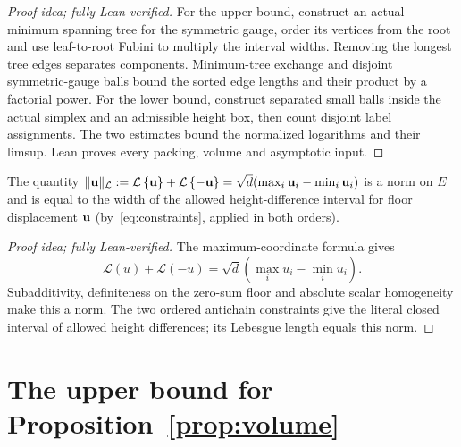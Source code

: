 \documentclass[11pt,letterpaper]{article}
\begin{document}
\begin{proof}[Proof idea; fully Lean-verified]
For the upper bound, construct an actual minimum spanning tree for the symmetric gauge, order its vertices from the root and use leaf-to-root Fubini to multiply the interval widths. Removing the longest tree edges separates components. Minimum-tree exchange and disjoint symmetric-gauge balls bound the sorted edge lengths and their product by a factorial power. For the lower bound, construct separated small balls inside the actual simplex and an admissible height box, then count disjoint label assignments. The two estimates bound the normalized logarithms and their limsup. Lean proves every packing, volume and asymptotic input.
\end{proof}


The quantity $\|\mathbf u\|_{\mathcal L}:=\mathcal L\left\{\mathbf u\right\}+\mathcal L\left\{-\mathbf u\right\}=\sqrt d(\max_i\mathbf u_i-\min_i\mathbf u_i)$ is a norm on $E$ and is equal to the width of the allowed height-difference interval for floor displacement $\mathbf u$ (by~\eqref{eq:constraints}, applied in both orders).

\begin{proof}[Proof idea; fully Lean-verified]
The maximum-coordinate formula gives \[\mathcal L(u)+\mathcal L(-u)=\sqrt d(\max_i u_i-\min_i u_i).\] Subadditivity, definiteness on the zero-sum floor and absolute scalar homogeneity make this a norm. The two ordered antichain constraints give the literal closed interval of allowed height differences; its Lebesgue length equals this norm.
\end{proof}

\section{The upper bound for Proposition~\ref{prop:volume}}
\end{document}
